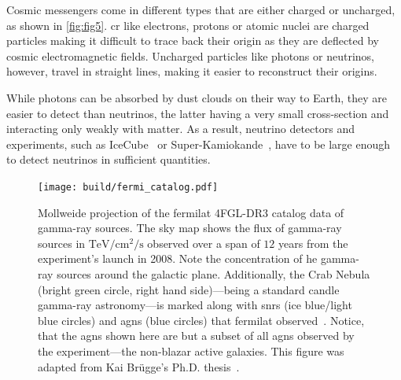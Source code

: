 Cosmic messengers come in different types that are either charged or uncharged, as shown in \autoref{fig:fig5}.
\gls{cr} like electrons, protons or atomic nuclei are charged particles making it difficult to trace back their origin
as they are deflected by cosmic electromagnetic fields. Uncharged particles like photons or
neutrinos, however, travel in straight lines, making it easier to reconstruct their origins.

While photons can be absorbed by dust clouds on their way to Earth, they are easier to detect than
neutrinos, the latter having a very small cross-section and interacting only weakly with matter.
As a result, neutrino detectors and experiments, such as IceCube~\cite{icecube_2006} or
Super-Kamiokande~\cite{kamiokande}, have to be large enough to detect neutrinos in sufficient quantities.

\begin{figure}
    \centering
    \texttt{[image: build/fermi\_catalog.pdf]}
    \caption{Mollweide projection of the \gls{fermilat} 4FGL-DR3 catalog data of gamma-ray sources. The sky map
    shows the flux of gamma-ray sources in \(\si{\tera\eV\per\centi\meter\squared\per\second}\)
    observed over a span of \(\num{12}\) years from the experiment's launch in 2008. Note the
    concentration of \gls{he} gamma-ray sources around the galactic plane. Additionally,
    the Crab Nebula (bright green circle, right hand side)---being a standard candle gamma-ray astronomy---is marked
    along with \glspl{snr} (ice blue/light blue circles) and \glspl{agn} (blue circles) that \gls{fermilat}
    observed~\cite{fermi4fgl, fermi4fgldr3}. Notice, that the \glspl{agn} shown here are but a subset
    of all \glspl{agn} observed by the experiment---the non-blazar active galaxies. This
    figure was adapted from Kai Br\"ugge's Ph.D. thesis~\cite{bruegge_thesis}.}%
    \label{fig:LAT}
\end{figure}


